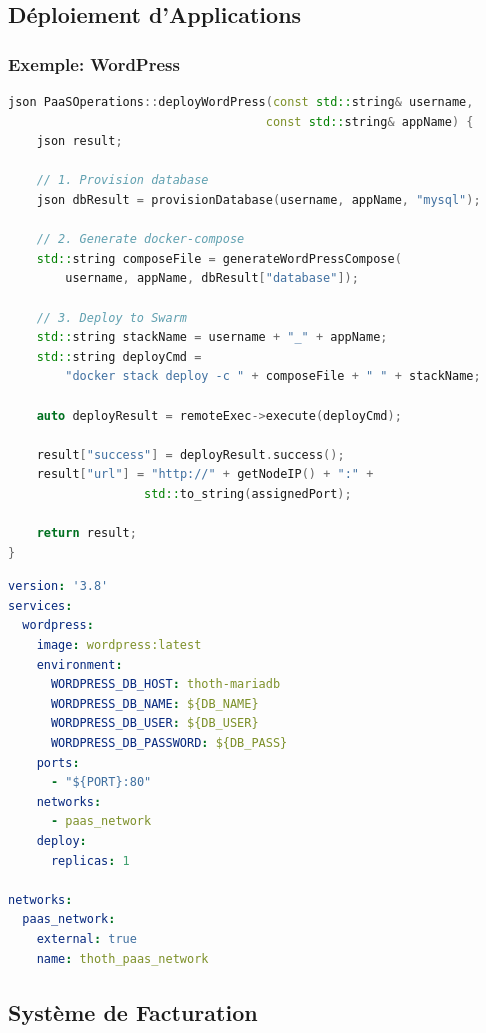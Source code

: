\documentclass[12pt,a4paper]{article}
\begin{document}
\subsection{Déploiement d'Applications}

\subsubsection{Exemple: WordPress}

\begin{lstlisting}[language=C++, caption=Déploiement WordPress]
json PaaSOperations::deployWordPress(const std::string& username,
                                    const std::string& appName) {
    json result;
    
    // 1. Provision database
    json dbResult = provisionDatabase(username, appName, "mysql");
    
    // 2. Generate docker-compose
    std::string composeFile = generateWordPressCompose(
        username, appName, dbResult["database"]);
    
    // 3. Deploy to Swarm
    std::string stackName = username + "_" + appName;
    std::string deployCmd = 
        "docker stack deploy -c " + composeFile + " " + stackName;
    
    auto deployResult = remoteExec->execute(deployCmd);
    
    result["success"] = deployResult.success();
    result["url"] = "http://" + getNodeIP() + ":" + 
                   std::to_string(assignedPort);
    
    return result;
}
\end{lstlisting}

\begin{lstlisting}[language=yaml, caption=Docker Compose WordPress]
version: '3.8'
services:
  wordpress:
    image: wordpress:latest
    environment:
      WORDPRESS_DB_HOST: thoth-mariadb
      WORDPRESS_DB_NAME: ${DB_NAME}
      WORDPRESS_DB_USER: ${DB_USER}
      WORDPRESS_DB_PASSWORD: ${DB_PASS}
    ports:
      - "${PORT}:80"
    networks:
      - paas_network
    deploy:
      replicas: 1
      
networks:
  paas_network:
    external: true
    name: thoth_paas_network
\end{lstlisting}

\subsection{Système de Facturation}
\end{document}

